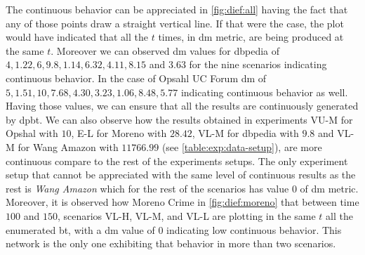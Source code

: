 The continuous behavior can be appreciated in \autoref{fig:dief:all} having the fact that any of those points draw a straight vertical line. 
If that were the case, the plot would have indicated that all the $t$ times, in \acrshort{dm} metric, are being produced at the same $t$.
Moreover we can observed \acrshort{dm} values for dbpedia of $4, 1.22, 6, 9.8, 1.14, 6.32, 4.11, 8.15$ and $3.63$ for the nine scenarios indicating continuous behavior. 
In the case of Opsahl UC Forum \acrshort{dm} of $5, 1.51, 10, 7.68, 4.30, 3.23, 1.06, 8.48, 5.77$ indicating continuous behavior as well.
Having those values, we can ensure that all the results are continuously generated by \acrshort{dpbt}.
We can also observe how the results obtained in experiments VU-M for Opshal with $10$, E-L for Moreno with $28.42$, VL-M for dbpedia with $9.8$ and VL-M for Wang Amazon with $11766.99$ (see \autoref{table:exp:data-setup}), are more continuous compare to the rest of the experiments setups. 
The only experiment setup that cannot be appreciated with the same level of continuous results as the rest is \emph{Wang Amazon} which for the rest of the scenarios has value $0$ of \acrshort{dm} metric. 
Moreover, it is observed how Moreno Crime in \autoref{fig:dief:moreno} that between time $100$ and $150$, scenarios VL-H, VL-M, and VL-L are plotting in the same $t$ all the enumerated \acrshort{bt}, with a \acrshort{dm} value of $0$ indicating low continuous behavior. 
This network is the only one exhibiting that behavior in more than two scenarios.


